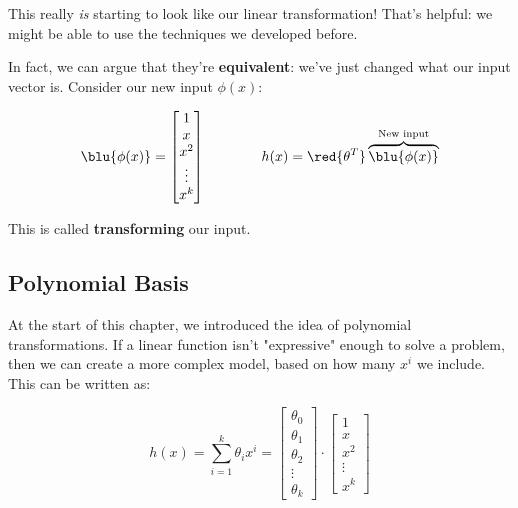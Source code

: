         This really \textit{is} starting to look like our linear transformation! That's helpful: we might be able to use the techniques we developed before.

        In fact, we can argue that they're \textbf{equivalent}: we've just changed what our input vector is. Consider our new input $\phi(x)$:

        \begin{equation}
            \blu{\phi(x)}
            = 
            \begin{bmatrix}
                1 \\ x \\ x^2 \\ \vdots \\ x^k
            \end{bmatrix}
            \qquad \qquad
            h(x) = 
            \red{\theta^T} 
            \overbrace{
            \blu{\phi(x)}
            }^{\text{New input}}
        \end{equation}
        
        This is called \textbf{transforming} our input.\\

        \subsection*{Polynomial Basis}

            At the start of this chapter, we introduced the idea of polynomial transformations. If a linear function isn't "expressive" enough to solve a problem, then we can create a more complex model, based on how many $x^i$ we include. This can be written as:

            \begin{equation}
                h(x) =
                \sum_{i=1}^{k}
                \theta_i x^i
                =
                \begin{bmatrix}
                 \theta_0 \\ \theta_1 \\ \theta_2 \\ \vdots \\ \theta_k
                \end{bmatrix}
                \cdot 
                \begin{bmatrix}
                    1 \\ x \\ x^2 \\ \vdots \\ x^k
                \end{bmatrix}
            \end{equation}

